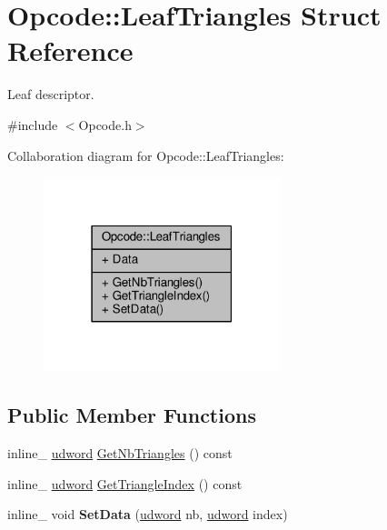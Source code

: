 \hypertarget{structOpcode_1_1LeafTriangles}{}\section{Opcode\+:\+:Leaf\+Triangles Struct Reference}
\label{structOpcode_1_1LeafTriangles}


Leaf descriptor.  




{\ttfamily \#include $<$Opcode.\+h$>$}



Collaboration diagram for Opcode\+:\+:Leaf\+Triangles\+:
\nopagebreak
\begin{figure}[H]
\begin{center}
\leavevmode
\includegraphics[width=195pt]{d4/d4b/structOpcode_1_1LeafTriangles__coll__graph}
\end{center}
\end{figure}
\subsection*{Public Member Functions}
\begin{DoxyCompactItemize}
\item 
inline\+\_\+ \hyperlink{IceTypes_8h_a44c6f1920ba5551225fb534f9d1a1733}{udword} \hyperlink{structOpcode_1_1LeafTriangles_a07e101a33231de77f77b69b640ff5352}{Get\+Nb\+Triangles} () const 
\item 
inline\+\_\+ \hyperlink{IceTypes_8h_a44c6f1920ba5551225fb534f9d1a1733}{udword} \hyperlink{structOpcode_1_1LeafTriangles_a580c6be165011c9db16552f4be8fbc13}{Get\+Triangle\+Index} () const 
\item 
inline\+\_\+ void {\bfseries Set\+Data} (\hyperlink{IceTypes_8h_a44c6f1920ba5551225fb534f9d1a1733}{udword} nb, \hyperlink{IceTypes_8h_a44c6f1920ba5551225fb534f9d1a1733}{udword} index)\hypertarget{structOpcode_1_1LeafTriangles_a16e95e1db0dfb690c8faf7f368fce52a}{}\label{structOpcode_1_1LeafTriangles_a16e95e1db0dfb690c8faf7f368fce52a}

\end{DoxyCompactItemize}
